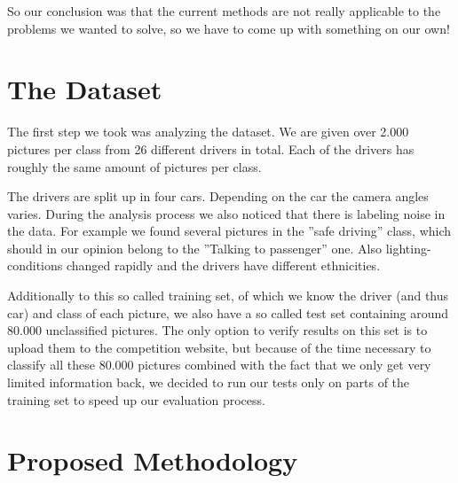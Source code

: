 \documentclass[10pt,twocolumn,letterpaper]{article}
\begin{document}
So our conclusion was that the current methods are not really applicable to the problems we wanted to solve, so we have to come up with something on our own!



\section{The Dataset}
The first step we took was analyzing the dataset. We are given over 2.000 pictures per class from 26 different drivers in total. Each of the drivers has roughly the same amount of pictures per class. 

The drivers are split up in four cars. Depending on the car the camera angles varies. During the analysis process we also noticed that there is labeling noise in the data. For example we found several pictures in the ''safe driving'' class, which should in our opinion belong to the ''Talking to passenger'' one. Also lighting-conditions changed rapidly and the drivers have different ethnicities.


Additionally to this so called training set, of which we know the driver (and thus car) and class of each picture, we also have a so called test set containing around 80.000 unclassified pictures. The only option to verify results on this set is to upload them to the competition website, but because of the time necessary to classify all these 80.000 pictures combined with the fact that we only get very limited information back, we decided to run our tests only on parts of the training set to speed up our evaluation process.







\section{Proposed Methodology}
\end{document}
